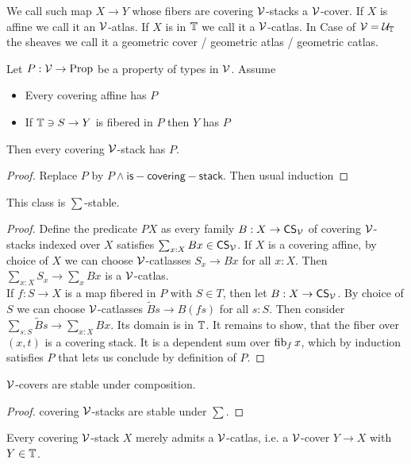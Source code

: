 \documentclass{article}
\newcommand{\CS}{\mathsf{CS}}
\begin{document}
We call such map $X \to Y$ whose fibers are covering $\mathcal{V}$-stacks a $\mathcal{V}$-cover. If $X$ is affine we call it an $\mathcal{V}$-atlas. If $X$ is in $\mathbb{T}$ we call it a $\mathcal{V}$-catlas. In Case of $\mathcal{V} = \mathcal{U}_{\mathbb{T}}$ the sheaves we call it a geometric cover / geometric atlas / geometric catlas.
\begin{prop}
 Let $P : \mathcal{V} \to \operatorname{Prop}$ be a property of types in $\mathcal{V}$. Assume
 \begin{itemize}
 	\item Every covering affine has $P$
 	\item If $\mathbb{T} \ni S \to Y$ is fibered in $P$ then $Y$ has $P$
 \end{itemize}
Then every covering $\mathcal{V}$-stack has $P$.
\end{prop}
\begin{proof}
		Replace $P$ by $P \land \mathsf{is-covering-stack}$. Then usual induction

\end{proof}
\begin{lemma}
	This class is $\sum$-stable.
\end{lemma}
\begin{proof}
	Define the predicate $P X$ as every family $B : X \to \CS_\cV$ of covering $\mathcal{V}$-stacks indexed over $X$ satisfies $\sum_{x: X} B x \in \CS_\cV$.
	If $X$ is a covering affine, by choice of $X$ we can choose $\mathcal{V}$-catlasses $S_x \to B x$ for all $x : X$. Then $\sum_{x :X } S_x \to \sum_x B x$ is a $\mathcal{V}$-catlas. \\
	If $f : S \to X$ is a map fibered in $P$ with $S \in T$, then let $B : X \to \CS_\cV$. By choice of $S$ we can choose $\mathcal{V}$-catlasses $\tilde B s \to B (f s)$ for all $s : S$. Then consider $\sum_{s : S} \tilde B s \to \sum_{x : X} B x$. Its domain is in $\mathbb{T}$. It remains to show, that the fiber over $(x,t)$ is a covering stack. It is a dependent sum over $\operatorname{fib}_f x$, which by induction satisfies $P$ that lets us conclude by definition of $P$.
\end{proof}
\begin{lemma}{\label{lemma:coversstableundercomp}}
	$\mathcal{V}$-covers are stable under composition.
\end{lemma}
\begin{proof}
	covering $\mathcal{V}$-stacks are stable under $\sum$.
\end{proof}
\begin{prop}{\label{prop:csHasAtlas}}
	Every covering $\mathcal{V}$-stack $X$ merely admits a $\mathcal{V}$-catlas, i.e. a $\mathcal{V}$-cover $Y \to X$ with $Y \in \mathbb{T}$. 
\end{prop}
\end{document}
